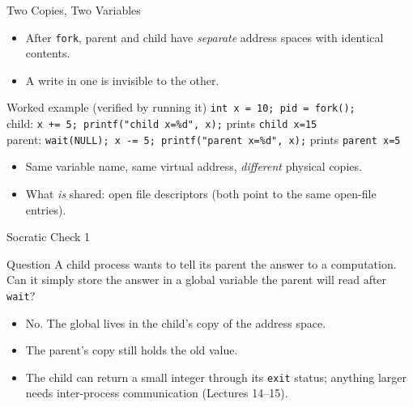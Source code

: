 \documentclass[aspectratio=169]{beamer}
\begin{document}
\begin{frame}{Two Copies, Two Variables}
  \begin{itemize}
    \item After \texttt{fork}, parent and child have \emph{separate} address
      spaces with identical contents.
    \item A write in one is invisible to the other.
  \end{itemize}
  \vspace{0.1cm}
  \begin{exampleblock}{Worked example (verified by running it)}
    \texttt{int x = 10; pid = fork();}\\
    child: \texttt{x += 5; printf("child x=\%d", x);} \quad prints
    \texttt{child x=15}\\
    parent: \texttt{wait(NULL); x -= 5; printf("parent x=\%d", x);} \quad
    prints \texttt{parent x=5}
  \end{exampleblock}
  \begin{itemize}
    \item Same variable name, same virtual address, \emph{different} physical
      copies.
    \item What \emph{is} shared: open file descriptors (both point to the same
      open-file entries).
  \end{itemize}
\end{frame}

\begin{frame}{Socratic Check 1}
  \begin{block}{Question}
    A child process wants to tell its parent the answer to a computation. Can
    it simply store the answer in a global variable the parent will read
    after \texttt{wait}?
  \end{block}
  \vspace{0.25cm}
  \begin{itemize}
    \item No. The global lives in the child's copy of the address space.
    \item The parent's copy still holds the old value.
    \item The child can return a small integer through its \texttt{exit}
      status; anything larger needs inter-process communication (Lectures
      14--15).
  \end{itemize}
\end{frame}

\end{document}
